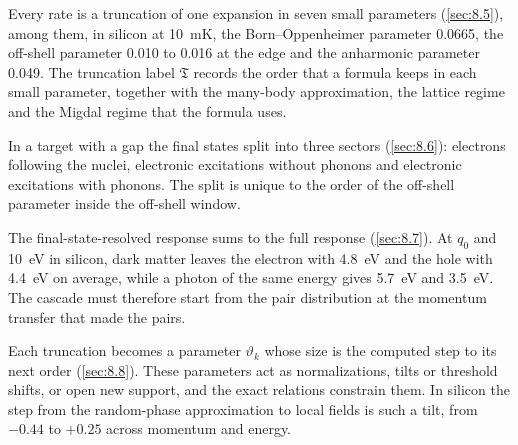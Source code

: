 Every rate is a truncation of one expansion in seven small parameters (\cref{sec:8.5}), among them, in silicon at \SI{10}{mK}, the Born--Oppenheimer parameter 0.0665, the off-shell parameter 0.010 to 0.016 at the edge and the anharmonic parameter 0.049. The truncation label $\mathfrak{T}$ records the order that a formula keeps in each small parameter, together with the many-body approximation, the lattice regime and the Migdal regime that the formula uses.

In a target with a gap the final states split into three sectors (\cref{sec:8.6}): electrons following the nuclei, electronic excitations without phonons and electronic excitations with phonons. The split is unique to the order of the off-shell parameter inside the off-shell window.

The final-state-resolved response sums to the full response (\cref{sec:8.7}). At $q_0$ and \SI{10}{eV} in silicon, dark matter leaves the electron with \SI{4.8}{eV} and the hole with \SI{4.4}{eV} on average, while a photon of the same energy gives \SI{5.7}{eV} and \SI{3.5}{eV}. The cascade must therefore start from the pair distribution at the momentum transfer that made the pairs.

Each truncation becomes a parameter $\vartheta_k$ whose size is the computed step to its next order (\cref{sec:8.8}). These parameters act as normalizations, tilts or threshold shifts, or open new support, and the exact relations constrain them. In silicon the step from the random-phase approximation to local fields is such a tilt, from $-0.44$ to $+0.25$ across momentum and energy.
